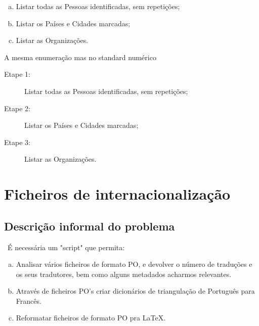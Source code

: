 \documentclass{report}
\begin{document}
\begin{enumerate}[a)]
\item Listar todas as Pessoas identificadas, sem repetições;
\item Listar os Países e Cidades marcadas;
\item Listar as Organizações.
\end{enumerate}

A mesma enumeração mas no standard numérico
\begin{description}
\item[Etape 1:] Listar todas as Pessoas identificadas, sem repetições;
\item[Etape 2:] Listar os Países e Cidades marcadas;
\item[Etape 3:] Listar as Organizações.
\end{description}


\chapter{Ficheiros de internacionalização} \label{fi}

\section{Descrição informal do problema}\
É necessária um "script" que permita:
\begin{enumerate}[a)]
\item Analisar vários ficheiros de formato PO, e devolver o número de traduções
e os seus tradutores, bem como alguns metadados acharmos relevantes.
\item Através de ficheiros PO's criar dicionários de triangulação de Português
para Francês.
\item Reformatar ficheiros de formato PO pra LaTeX.
\end{enumerate}
\end{document}
